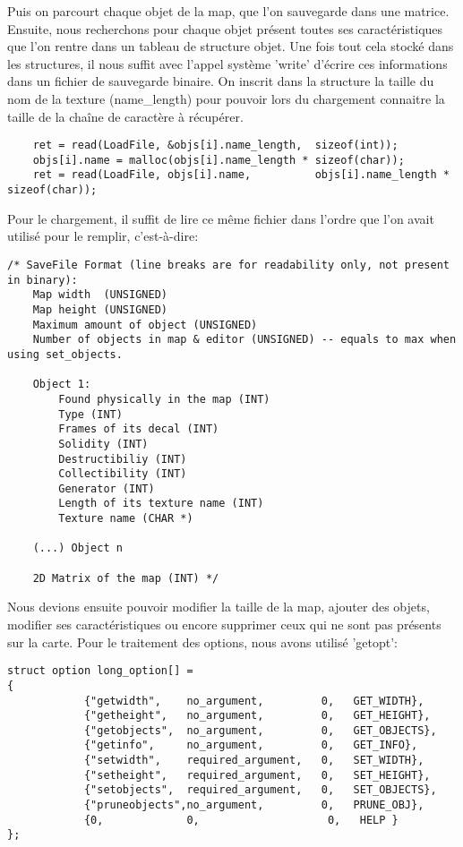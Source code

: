\documentclass[a4paper]{article}
\begin{document}
Puis on parcourt chaque objet de la map, que l'on sauvegarde dans une matrice. Ensuite, nous recherchons pour chaque objet présent toutes ses caractéristiques que l'on rentre dans un tableau de structure objet. Une fois tout cela stocké dans les structures, il nous suffit avec l'appel système 'write' d'écrire ces informations dans un fichier de sauvegarde binaire. On inscrit dans la structure la taille du nom de la texture (name\_length) pour pouvoir lors du chargement connaitre la taille de la chaîne de caractère à récupérer.


\begin{verbatim}
    ret = read(LoadFile, &objs[i].name_length,  sizeof(int));
    objs[i].name = malloc(objs[i].name_length * sizeof(char));
    ret = read(LoadFile, objs[i].name,          objs[i].name_length * sizeof(char));
\end{verbatim}   

Pour le chargement, il suffit de lire ce même fichier dans l'ordre que l'on avait utilisé pour le remplir, c'est-à-dire:

\begin{verbatim}
/* SaveFile Format (line breaks are for readability only, not present in binary):
    Map width  (UNSIGNED)
    Map height (UNSIGNED)
    Maximum amount of object (UNSIGNED)
    Number of objects in map & editor (UNSIGNED) -- equals to max when using set_objects.

    Object 1:
        Found physically in the map (INT)
        Type (INT)
        Frames of its decal (INT)
        Solidity (INT)
        Destructibiliy (INT)
        Collectibility (INT)
        Generator (INT)
        Length of its texture name (INT)
        Texture name (CHAR *)

    (...) Object n

    2D Matrix of the map (INT) */
\end{verbatim}

Nous devions ensuite pouvoir modifier la taille de la map, ajouter des objets, modifier ses caractéristiques ou encore supprimer ceux qui ne sont pas présents sur la carte.
Pour le traitement des options, nous avons utilisé 'getopt':

\begin{verbatim}
struct option long_option[] =
{
            {"getwidth",    no_argument,         0,   GET_WIDTH},
            {"getheight",   no_argument,         0,   GET_HEIGHT},
            {"getobjects",  no_argument,         0,   GET_OBJECTS},
            {"getinfo",     no_argument,         0,   GET_INFO},
            {"setwidth",    required_argument,   0,   SET_WIDTH},
            {"setheight",   required_argument,   0,   SET_HEIGHT}, 
            {"setobjects",  required_argument,   0,   SET_OBJECTS},
            {"pruneobjects",no_argument,         0,   PRUNE_OBJ},
            {0,             0,                    0,   HELP }
};
\end{verbatim} 
\end{document}
